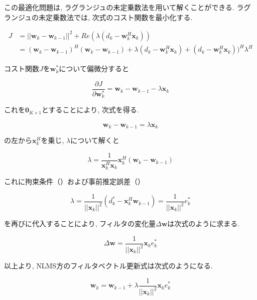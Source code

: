 この最適化問題は, ラグランジュの未定乗数法を用いて解くことができる. ラグランジュの未定乗数法では, 次式のコスト関数を最小化する. 

\begin{equation}
\begin{split}
J &= ||\bm{w}_k - \bm{w}_{k-1}||^2  + Re(\lambda (d_k - \bm{w}_k^H \bm{x}_k)) \\
  &= (\bm{w}_k - \bm{w}_{k-1})^H (\bm{w}_k - \bm{w}_{k-1}) + \lambda (d_k - \bm{w}_k^H \bm{x}_k) + (d_k - \bm{w}_k^H \bm{x}_k))^H \lambda^H
\end{split}
\end{equation}

コスト関数\(J\)を\(\bm{w}_k^*\)について偏微分すると

\begin{equation}
\frac{\partial J}{\partial \bm{w}_k^*} = \bm{w}_k - \bm{w}_{k-1} - \lambda \bm{x}_k
\end{equation}

これを\(\bm{0}_{K \times 1}\)とすることにより, 次式を得る. 

\begin{equation}
\bm{w}_k - \bm{w}_{k-1} = \lambda \bm{x}_k
\label{equ:w-w_k}
\end{equation}

の左から\(\bm{x}_k^H\)を乗じ, \(\lambda\)について解くと

\begin{equation}
\lambda = \frac{1}{\bm{x}_k^H \bm{x}_k} \bm{x}_k^H (\bm{w}_k - \bm{w}_{k-1})
\end{equation}

これに拘束条件（）および事前推定誤差（）

\begin{equation}
\lambda = \frac{1}{ ||\bm{x}_k||^2 } (d_k^* - \bm{x}_k^H \bm{w}_{k-1}) = \frac{1}{||\bm{x}_k||^2} e_k^*
\label{equ:lambda}
\end{equation}

を再びに代入することにより, フィルタの変化量\(\Delta \bm{w}\)は次式のように求まる. 

\begin{equation}
\Delta \bm{w} = \frac{1}{||\bm{x}_k||^2} \bm{x}_k e_k^*
\end{equation}

以上より, NLMS方のフィルタベクトル更新式は次式のようになる. 

\begin{equation}
\bm{w}_k = \bm{w}_{k-1} + \lambda \frac{1}{||\bm{x}_k||^2} \bm{x}_k e_k^*
\end{equation}

